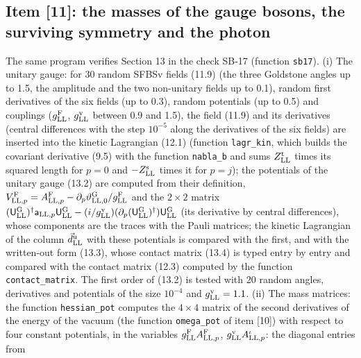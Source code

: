 \documentclass[
  10pt,
]{article}
\begin{document}
\hypertarget{item-11-the-masses-of-the-gauge-bosons-the-surviving-symmetry-and-the-photon}{%
\subsection{Item {[}11{]}: the masses of the gauge bosons, the surviving
symmetry and the
photon}\label{item-11-the-masses-of-the-gauge-bosons-the-surviving-symmetry-and-the-photon}}

The same program verifies Section 13 in the check SB-17 (function
\texttt{sb17}). (i) The unitary gauge: for 30 random SFBSv fields (11.9)
(the three Goldstone angles up to 1.5, the amplitude and the two
non-unitary fields up to 0.1), random first derivatives of the six
fields (up to 0.3), random potentials (up to 0.5) and couplings
(\(g^{\rm F}_{\rm LL}\), \(g^{\rm v}_{\rm LL}\) between 0.9 and 1.5),
the field (11.9) and its derivatives (central differences with the step
\(10^{-5}\) along the derivatives of the six fields) are inserted into
the kinetic Lagrangian (12.1) (function \texttt{lagr\_kin}, which builds
the covariant derivative (9.5) with the function \texttt{nabla\_b} and
sums \(Z^{\rm t}_{\rm LL}\) times its squared length for \(p=0\) and
\(-Z^{\rm s}_{\rm LL}\) times it for \(p=j\)); the potentials of the
unitary gauge (13.2) are computed from their definition,
\(V^{\rm F}_{{\rm LL},p}=A^{\rm F}_{{\rm LL},p}-\partial_p\vartheta^{\rm G}_{{\rm LL},0}/g^{\rm F}_{\rm LL}\)
and the \(2\times2\) matrix
\((\mathsf U^{\rm G}_{\rm LL})^\dagger\mathsf a_{{\rm LL},p}\mathsf U^{\rm G}_{\rm LL}-(i/g^{\rm v}_{\rm LL})(\partial_p(\mathsf U^{\rm G}_{\rm LL})^\dagger)\mathsf U^{\rm G}_{\rm LL}\)
(its derivative by central differences), whose components are the traces
with the Pauli matrices; the kinetic Lagrangian of the column
\(\vec d^{\rm u}_{\rm LL}\) with these potentials is compared with the
first, and with the written-out form (13.3), whose contact matrix (13.4)
is typed entry by entry and compared with the contact matrix (12.3)
computed by the function \texttt{contact\_matrix}. The first order of
(13.2) is tested with 20 random angles, derivatives and potentials of
the size \(10^{-4}\) and \(g^{\rm v}_{\rm LL}=1.1\). (ii) The mass
matrices: the function \texttt{hessian\_pot} computes the \(4\times4\)
matrix of the second derivatives of the energy of the vacuum (the
function \texttt{omega\_pot} of item {[}10{]}) with respect to four
constant potentials, in the variables
\(g^{\rm F}_{\rm LL}A^{\rm F}_{{\rm LL},p}\),
\(g^{\rm v}_{\rm LL}A^\iota_{{\rm LL},p}\): the diagonal entries from
\end{document}
